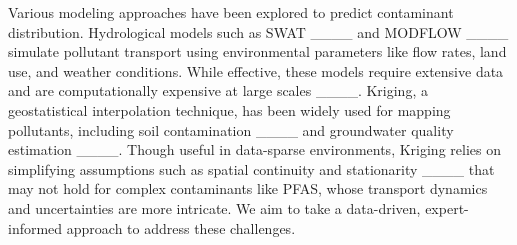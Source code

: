 Various modeling approaches have been explored to predict contaminant distribution. %
Hydrological models such as SWAT ____ and MODFLOW ____ simulate pollutant transport using environmental parameters like flow rates, land use, and weather conditions. While effective, these models require extensive data %
and are computationally expensive at large scales ____. %
%
Kriging, a geostatistical interpolation technique, has been widely used for mapping pollutants, including soil contamination ____ and groundwater quality estimation ____. Though useful in data-sparse environments, Kriging relies on simplifying assumptions such as spatial continuity and stationarity ____ that may not hold for complex contaminants like PFAS, whose transport dynamics and uncertainties are  more intricate. We aim to take a data-driven, expert-informed approach to address these challenges. %





